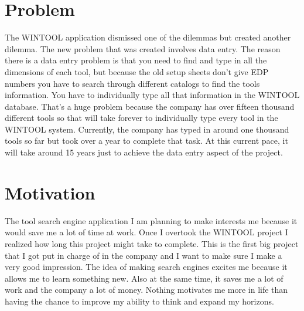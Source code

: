 \section{Problem}

The WINTOOL application dismissed one of the dilemmas but created another dilemma. The new problem that was created involves data entry. The reason there is a data entry problem is that you need to find and type in all the dimensions of each tool, but because the old setup sheets don't give EDP numbers you have to search through different catalogs to find the tools information.  You have to individually type all that information in the WINTOOL database. That's a huge problem because the company has over fifteen thousand different tools so that will take forever to individually type every tool in the WINTOOL system. Currently, the company has typed in around one thousand tools so far but took over a year to complete that task. At this current pace, it will take around 15 years just to achieve the data entry aspect of the project.


\section{Motivation}

The tool search engine application I am planning to make interests me because it would save me a lot of time at work. Once I overtook the WINTOOL project I realized how long this project might take to complete. This is the first big project that I got put in charge of in the company and I want to make sure I make a very good impression. The idea of making search engines excites me because it allows me to learn something new. Also at the same time, it saves me a lot of work and the company a lot of money. Nothing motivates me more in life than having the chance to improve my ability to think and expand my horizons.
